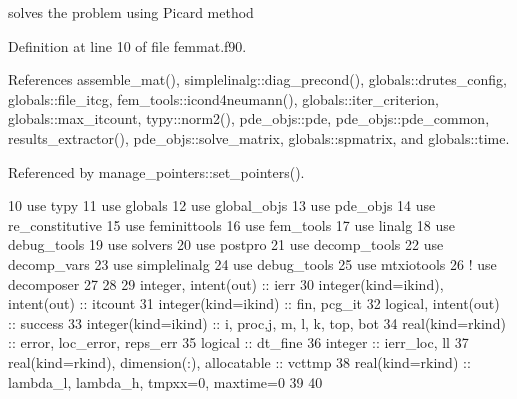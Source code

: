 solves the problem using Picard method 



Definition at line 10 of file femmat.\+f90.



References assemble\+\_\+mat(), simplelinalg\+::diag\+\_\+precond(), globals\+::drutes\+\_\+config, globals\+::file\+\_\+itcg, fem\+\_\+tools\+::icond4neumann(), globals\+::iter\+\_\+criterion, globals\+::max\+\_\+itcount, typy\+::norm2(), pde\+\_\+objs\+::pde, pde\+\_\+objs\+::pde\+\_\+common, results\+\_\+extractor(), pde\+\_\+objs\+::solve\+\_\+matrix, globals\+::spmatrix, and globals\+::time.



Referenced by manage\+\_\+pointers\+::set\+\_\+pointers().


\begin{DoxyCode}
10       \textcolor{keywordtype}{use }typy
11       \textcolor{keywordtype}{use }globals
12       \textcolor{keywordtype}{use }global_objs
13       \textcolor{keywordtype}{use }pde_objs
14       \textcolor{keywordtype}{use }re_constitutive
15       \textcolor{keywordtype}{use }feminittools
16       \textcolor{keywordtype}{use }fem_tools
17       \textcolor{keywordtype}{use }linalg
18       \textcolor{keywordtype}{use }debug_tools
19       \textcolor{keywordtype}{use }solvers
20       \textcolor{keywordtype}{use }postpro
21       \textcolor{keywordtype}{use }decomp_tools
22       \textcolor{keywordtype}{use }decomp_vars
23       \textcolor{keywordtype}{use }simplelinalg
24       \textcolor{keywordtype}{use }debug_tools
25       \textcolor{keywordtype}{use }mtxiotools
26 \textcolor{comment}{!       use decomposer}
27 
28 
29       \textcolor{keywordtype}{integer}, \textcolor{keywordtype}{intent(out)} :: ierr
30       \textcolor{keywordtype}{integer(kind=ikind)}, \textcolor{keywordtype}{intent(out)} :: itcount
31       \textcolor{keywordtype}{integer(kind=ikind)} ::  fin, pcg\_it
32       \textcolor{keywordtype}{logical}, \textcolor{keywordtype}{intent(out)} :: success
33       \textcolor{keywordtype}{integer(kind=ikind)} :: i, proc,j, m, l, k, top, bot
34       \textcolor{keywordtype}{real(kind=rkind)} :: error, loc\_error, reps\_err
35       \textcolor{keywordtype}{logical} :: dt\_fine
36       \textcolor{keywordtype}{integer} :: ierr\_loc, ll
37       \textcolor{keywordtype}{real(kind=rkind)}, \textcolor{keywordtype}{dimension(:)}, \textcolor{keywordtype}{allocatable} :: vcttmp
38       \textcolor{keywordtype}{real(kind=rkind)} :: lambda\_l, lambda\_h, tmpxx=0, maxtime=0
39 
40       

\end{DoxyCode}

